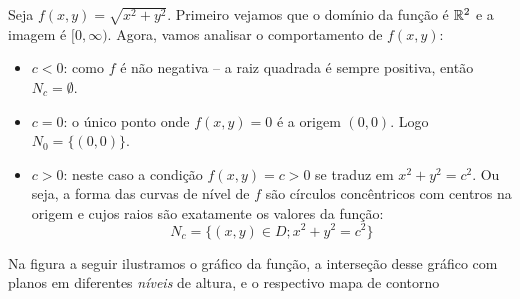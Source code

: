 \begin{example}{}{}
Seja \(f(x,y) = \sqrt{x^2 + y^2}\). Primeiro vejamos que o domínio da função é $\mathbb{R}^2$ e a imagem é $[0,\infty)$. Agora, vamos analisar o comportamento de \(f(x,y)\):
\begin{itemize}[label=\color{examplescolor}\textbullet]

\item $c<0$: como $f$ é não negativa -- a raiz quadrada é sempre positiva, então $N_c=\emptyset$.

\item $c=0$: o único ponto onde \(f(x,y) = 0\) é a origem \((0,0)\). Logo $N_0=\{(0,0)\}$. 


\item $c>0$: neste caso a condição $f(x,y)=c>0$ se traduz em $x^2+y^2=c^2$. Ou seja, a forma das curvas de nível de $f$ são círculos  concêntricos com centros na origem e cujos raios são exatamente os valores da função:
$$N_c=\{(x,y)\in D; x^2+y^2=c^2\}$$
\end{itemize}

Na figura a seguir ilustramos o gráfico da função, a interseção desse gráfico com planos em diferentes \textit{níveis} de altura, e o respectivo mapa de contorno 
\begin{center}
\end{center}
\end{example}
